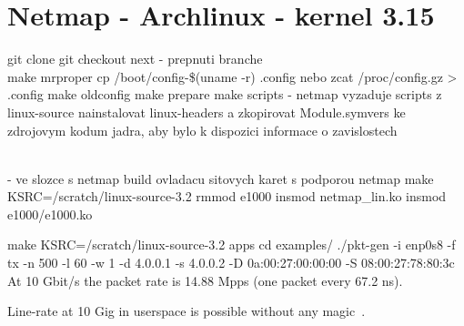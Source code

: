 
\chapter{Netmap - Archlinux - kernel 3.15}
git clone
git checkout next - prepnuti branche
\\

make mrproper
cp /boot/config-\$(uname -r) .config   nebo  zcat /proc/config.gz > .config
make oldconfig
make prepare
make scripts - netmap vyzaduje scripts z linux-source
nainstalovat linux-headers a zkopirovat Module.symvers ke zdrojovym kodum jadra, aby bylo k dispozici informace o zavislostech

\\

- ve slozce s netmap build ovladacu sitovych karet s podporou netmap
make KSRC=/scratch/linux-source-3.2
rmmod e1000
insmod netmap_lin.ko
insmod e1000/e1000.ko

make KSRC=/scratch/linux-source-3.2 apps
cd examples/
./pkt-gen -i enp0s8 -f tx -n 500 -l 60 -w 1 -d 4.0.0.1 -s 4.0.0.2 -D 0a:00:27:00:00:00 -S 08:00:27:78:80:3c
\\


At 10 Gbit/s the packet rate is 14.88 Mpps (one packet every 67.2 ns).

Line-rate at 10 Gig in userspace is possible without any magic~\cite{netmap-slides}.
